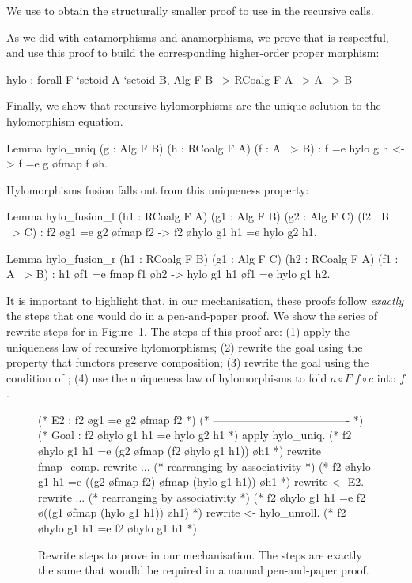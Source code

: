 \documentclass[a4paper,anonymous, UKenglish,cleveref, autoref, thm-restate]{lipics-v2021}
\begin{document}
\noindent
We use  to obtain the structurally smaller proof to use in
the recursive calls.

\noindent
As we did with catamorphisms and anamorphisms, we
prove that  is respectful, and use this proof to build the
corresponding higher-order proper morphism:
\begin{coqcode}
hylo : forall F `{setoid A} `{setoid B}, Alg F B ~> RCoalg F A ~> A ~> B
\end{coqcode}
Finally, we show that recursive hylomorphisms are the unique solution to the
hylomorphism equation.
\begin{coqcode}
Lemma hylo_uniq (g : Alg F B) (h : RCoalg F A) (f : A ~> B)
    : f =e hylo g h <-> f =e g \o fmap f \o h.
\end{coqcode}
Hylomorphisms fusion falls out from this uniqueness property:
\begin{coqcode}
Lemma hylo_fusion_l
  (h1 : RCoalg F A) (g1 : Alg F B) (g2 : Alg F C) (f2 : B ~> C)
  : f2 \o g1 =e g2 \o fmap f2 -> f2 \o hylo g1 h1 =e hylo g2 h1.

Lemma hylo_fusion_r
  (h1 : RCoalg F B) (g1 : Alg F C) (h2 : RCoalg F A) (f1 : A ~> B)
  :  h1 \o f1 =e fmap f1 \o h2 -> hylo g1 h1 \o f1 =e hylo g1 h2.
\end{coqcode}

\noindent
It is important to highlight that, in our mechanisation, these proofs follow
\emph{exactly} the steps that one would do in a pen-and-paper proof.  We show
the series of rewrite steps for  in
Figure~\ref{fig:proof-fusion-l}. The steps of this proof are: (1) apply the
uniqueness law of recursive hylomorphisms; (2) rewrite the goal using the
property that functors preserve composition; (3) rewrite the goal using the
condition of ; (4) use the uniqueness law of hylomorphisms to
fold $a \circ F \; f \circ c$ into $f$.
\begin{figure}[t!]
\begin{coqcode}
(* E2 : f2 \o g1 =e g2 \o fmap f2 *)
(* ------------------------------------- *)
(* Goal : f2 \o hylo g1 h1 =e hylo g2 h1 *)
apply hylo_uniq.
       (* f2 \o hylo g1 h1 =e (g2 \o fmap (f2 \o hylo g1 h1)) \o h1        *)
rewrite fmap_comp.
rewrite ... (* rearranging by associativity *)
       (* f2 \o hylo g1 h1 =e ((g2 \o fmap f2) \o fmap (hylo g1 h1)) \o h1 *)
rewrite <- E2.
rewrite ... (* rearranging by associativity *)
       (* f2 \o hylo g1 h1 =e f2 \o ((g1 \o fmap (hylo g1 h1)) \o h1)      *)
rewrite <- hylo_unroll.
       (* f2 \o hylo g1 h1 =e f2 \o hylo g1 h1                             *)
\end{coqcode}

  \vspace{-.5cm}
  \caption{Rewrite steps to prove  in our mechanisation. The
steps are exactly the same that woudld be required in a manual pen-and-paper
proof.}
\label{fig:proof-fusion-l}
\end{figure}
\end{document}
